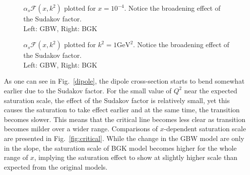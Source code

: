 \documentclass[11pt]{article}
\begin{document}
\begin{figure}[H]
\caption{$\alpha_s\mathcal{F}(x,k^2)$ plotted for $x=10^{-4}$. Notice the broadening effect of the Sudakov factor.\\Left: GBW, Right: BGK}
\label{fig:gluon}
\end{figure}
\begin{figure}[H]
\caption{$\alpha_s\mathcal{F}(x,k^2)$ plotted for $k^2=1\mathrm{GeV^2}$. Notice the broadening effect of the Sudakov factor.\\Left: GBW, Right: BGK}
\label{fig:gluon-x}
\end{figure}

As one can see in Fig.~\ref{dipole}, the dipole cross-section starts to bend somewhat earlier due to the Sudakov factor. For the small value of $Q^2$ near the expected saturation scale, the effect of the Sudakov factor is relatively small, yet this causes the saturation to take effect earlier and at the same time, the transition becomes slower. This means that the critical line becomes less clear as transition becomes milder over a wider range. %
Comparisons of $x$-dependent saturation scale are presented in Fig.~\ref{fig:critical}. While the change in the GBW model  are only in the slope, the saturation scale of  BGK model becomes higher for the whole range of $x$, implying the saturation effect to show at slightly higher scale than expected from the original models.
\end{document}
